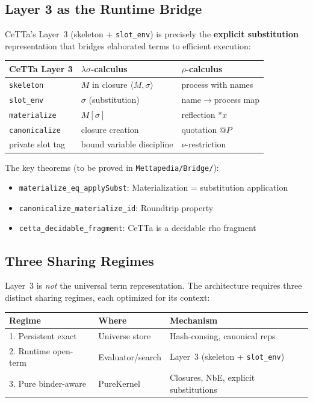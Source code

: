 \documentclass[11pt]{article}
\newcommand{\code}[1]{\texttt{#1}}
\newcommand{\CeTTa}{\textup{CeTTa}}
\begin{document}
\subsection{Layer 3 as the Runtime Bridge}

\CeTTa{}'s Layer~3 (skeleton + \code{slot\_env}) is precisely the
\textbf{explicit substitution} representation that bridges elaborated
terms to efficient execution:

\begin{center}
\begin{tabular}{lll}
\toprule
\textbf{CeTTa Layer 3} & \textbf{$\lambda\sigma$-calculus} & \textbf{$\rho$-calculus} \\
\midrule
\code{skeleton} & $M$ in closure $\langle M, \sigma \rangle$ & process with names \\
\code{slot\_env} & $\sigma$ (substitution) & name$\to$process map \\
\code{materialize} & $M[\sigma]$ & reflection $*x$ \\
\code{canonicalize} & closure creation & quotation $@P$ \\
private slot tag & bound variable discipline & $\nu$-restriction \\
\bottomrule
\end{tabular}
\end{center}

The key theorems (to be proved in \code{Mettapedia/Bridge/}):
\begin{itemize}
\item \code{materialize\_eq\_applySubst}: Materialization = substitution application
\item \code{canonicalize\_materialize\_id}: Roundtrip property
\item \code{cetta\_decidable\_fragment}: CeTTa is a decidable rho fragment
\end{itemize}

\subsection{Three Sharing Regimes}

Layer~3 is \emph{not} the universal term representation.  The architecture
requires three distinct sharing regimes, each optimized for its context:

\begin{center}
\begin{tabular}{lll}
\toprule
\textbf{Regime} & \textbf{Where} & \textbf{Mechanism} \\
\midrule
1. Persistent exact & Universe store & Hash-consing, canonical reps \\
2. Runtime open-term & Evaluator/search & Layer~3 (skeleton + \code{slot\_env}) \\
3. Pure binder-aware & PureKernel & Closures, NbE, explicit substitutions \\
\bottomrule
\end{tabular}
\end{center}
\end{document}
